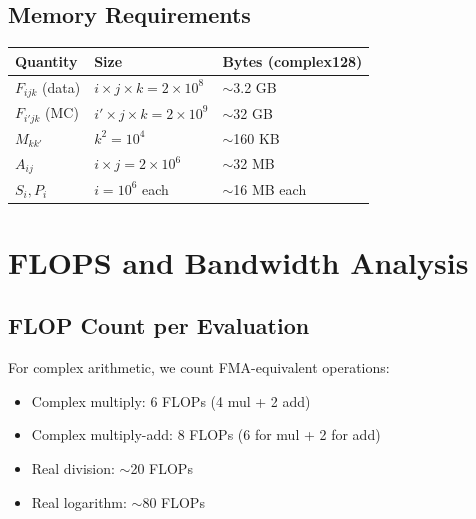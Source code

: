 \documentclass[11pt,a4paper]{article}
\begin{document}
\subsection{Memory Requirements}

\begin{center}
\begin{tabular}{@{}lll@{}}
\toprule
\textbf{Quantity} & \textbf{Size} & \textbf{Bytes (complex128)} \\ \midrule
$F_{ijk}$ (data) & $i \times j \times k = 2 \times 10^8$ & $\sim$3.2 GB \\
$F_{i'jk}$ (MC) & $i' \times j \times k = 2 \times 10^9$ & $\sim$32 GB \\
$M_{kk'}$ & $k^2 = 10^4$ & $\sim$160 KB \\
$A_{ij}$ & $i \times j = 2 \times 10^6$ & $\sim$32 MB \\
$S_i, P_i$ & $i = 10^6$ each & $\sim$16 MB each \\ \bottomrule
\end{tabular}
\end{center}

\section{FLOPS and Bandwidth Analysis}

\subsection{FLOP Count per Evaluation}

For complex arithmetic, we count FMA-equivalent operations:
\begin{itemize}
    \item Complex multiply: 6 FLOPs (4 mul + 2 add)
    \item Complex multiply-add: 8 FLOPs (6 for mul + 2 for add)
    \item Real division: $\sim$20 FLOPs
    \item Real logarithm: $\sim$80 FLOPs
\end{itemize}
\end{document}
